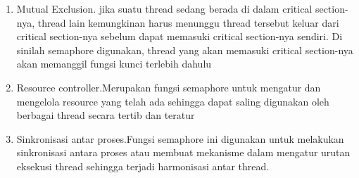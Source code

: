		 \begin{enumerate}
		 	\item Mutual Exclusion. jika suatu thread sedang berada di dalam critical section-nya, thread lain kemungkinan  harus menunggu thread tersebut keluar dari critical section-nya sebelum dapat memasuki critical section-nya sendiri. Di sinilah semaphore digunakan, thread yang akan memasuki critical section-nya akan memanggil fungsi kunci terlebih dahulu 
			\item Resource controller.Merupakan fungsi semaphore untuk mengatur dan mengelola resource yang  telah ada sehingga dapat saling digunakan oleh berbagai thread secara tertib dan teratur
			\item Sinkronisasi antar proses.Fungsi semaphore ini digunakan  untuk melakukan sinkronisasi antara proses atau membuat mekanisme dalam mengatur urutan eksekusi thread sehingga terjadi harmonisasi antar thread.
		\end{enumerate}
		 	